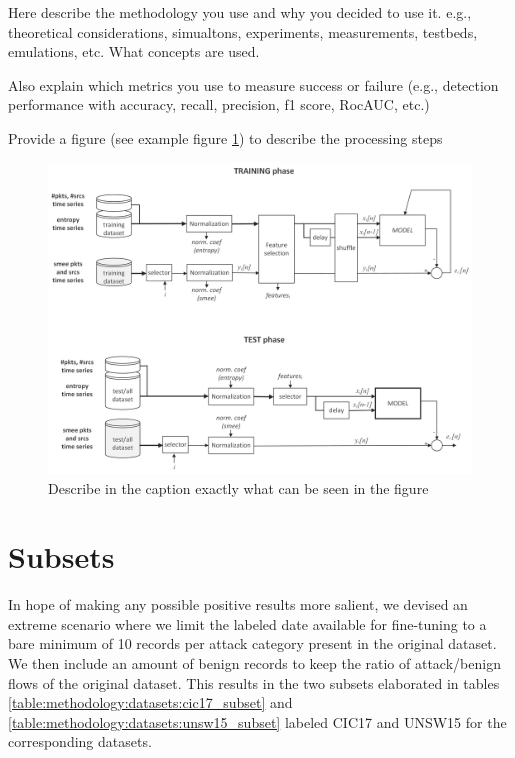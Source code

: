 Here describe the methodology you use and why you decided to use it.
e.g., theoretical considerations, simualtons, experiments, measurements, testbeds, emulations, etc. What concepts are used.

Also explain which metrics you use to measure success or failure (e.g., detection performance with accuracy, recall, precision, f1 score, RocAUC, etc.)


Provide a figure (see example figure \ref{fig:modeling-example}) to describe the processing steps

\begin{figure}[h]
	\centering
	\includegraphics[width=0.95\linewidth]{graphics/modeling-example}
	\caption{Describe in the caption exactly what can be seen in the figure}
	\label{fig:modeling-example}
\end{figure}

\section{Subsets}

In hope of making any possible positive results more salient, we devised an extreme scenario where we limit the labeled date available for fine-tuning to a bare minimum of 10 records per attack category present in the original dataset. We then include an amount of benign records to keep the ratio of attack/benign flows of the original dataset. This results in the two subsets elaborated in tables \ref{table:methodology:datasets:cic17_subset} and \ref{table:methodology:datasets:unsw15_subset} labeled CIC17 and UNSW15 for the corresponding datasets.

